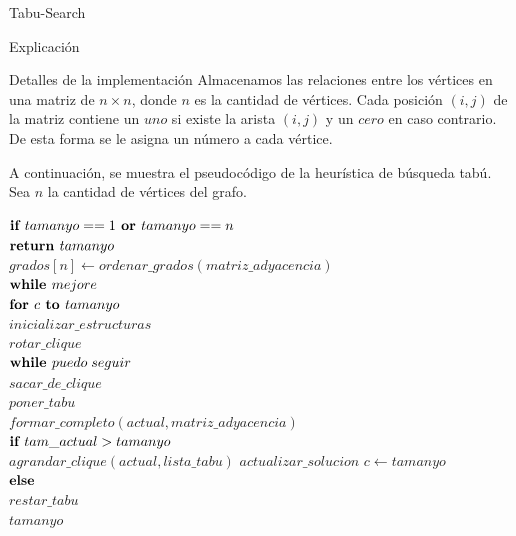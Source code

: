 \begin{section}{Tabu-Search}
\begin{subsection}{Explicación}

	\end{subsection}
	\begin{subsection}{Detalles de la implementación}
		Almacenamos las relaciones entre los vértices en una matriz de $n \times n$, donde $n$ es la cantidad de vértices. Cada posición $(i,j)$ de la matriz contiene un $uno$ si existe la arista $(i,j)$ y un $cero$ en caso contrario. De esta forma se le asigna un número a cada vértice.\VSP

		A continuación, se muestra el pseudocódigo de la heurística de búsqueda tabú.\\

		Sea $n$ la cantidad de vértices del grafo.

		\begin{pseudo}
			\tab $\textbf{if } tamanyo==1 \textbf{ or } tamanyo==n$\\
			\tab \tab $\textbf{return } tamanyo$\\
			\tab $grados[n] \leftarrow ordenar\_grados(matriz\_adyacencia)$\\
			\tab $\textbf{while } mejore$\\
			\tab \tab $\textbf{for } c \textbf{ to } tamanyo$\\
			\tab \tab \tab $inicializar\_estructuras$\\
			\tab \tab \tab $rotar\_clique$\\
			\tab \tab \tab $\textbf{while } puedo\;seguir$\\
			\tab \tab \tab \tab $sacar\_de\_clique$\\
			\tab \tab \tab \tab $poner\_tabu$\\
			\tab \tab \tab \tab $formar\_completo(actual,matriz\_adyacencia)$\\
			\tab \tab \tab \tab $\textbf{if } tam\_actual>tamanyo$\\
			\tab \tab \tab \tab \tab $agrandar\_clique(actual,lista\_tabu)$
			\tab \tab \tab \tab \tab $actualizar\_solucion$
			\tab \tab \tab \tab \tab $c \leftarrow tamanyo$\\
			\tab \tab \tab \tab $\textbf{else }$\\
			\tab \tab \tab \tab \tab $restar\_tabu$\\
			\tab \RET $tamanyo$\\
		\end{pseudo}


\end{subsection}
\end{section}
